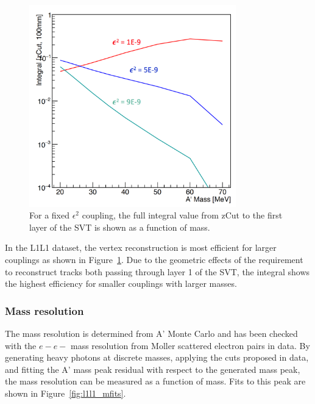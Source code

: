 \begin{figure}[H]
  \centering
     \includegraphics[width=0.8\textwidth]{plots/L1L1_eff1d.png}
  \caption{For a fixed $\epsilon^2$ coupling, the full integral value from zCut to the first layer of the SVT is shown as a function of mass. }
  \label{fig:integratedVal1D}
\end{figure} 

In the L1L1 dataset, the vertex reconstruction is most efficient for larger couplings as shown in Figure~\ref{fig:integratedVal1D}. Due to the geometric effects of the requirement to reconstruct tracks both passing through layer 1 of the SVT, the integral shows the highest efficiency for smaller couplings with larger masses.

\subsubsection{Mass resolution}

The mass resolution is determined from A' Monte Carlo and has been checked with the $e-e-$ mass resolution from Moller scattered electron pairs in data. By generating heavy photons at discrete masses, applying the cuts proposed in data, and fitting the A' mass peak residual with respect to the generated mass peak, the mass resolution can be measured as a function of mass. Fits to this peak are shown in Figure~\ref{fig:l1l1_mfits}.

